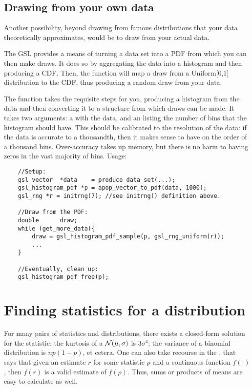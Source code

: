 \subsection{Drawing from your own data} 
Another possibility, beyond drawing from famous distributions that your
data theoretically approximates, would be to draw from your actual data.

The GSL provides a means of turning a data set into a PDF from which you
can then make draws.  It
does so by aggregating the data into a histogram and then producing a CDF.
Then, the  function will
map a draw from a Uniform[0,1] distribution to the CDF, thus producing a
random draw from your data.

The  function takes the requisite steps
for you, producing a histogram from the data and then converting it to
a  structure from which draws can be
made. It takes two arguments: a  with the data, and
an  listing the number of bins that the histogram should
have. This should be calibrated to the resolution of the data: if the
data is accurate to a thousandth, then it makes sense to have on the
order  of a thousand
bins. Over-accuracy takes up memory, but there is no harm to having
zeros in the vast majority of bins. Usage:
\begin{lstlisting}
    //Setup:
    gsl_vector  *data    = produce_data_set(...);
    gsl_histogram_pdf *p = apop_vector_to_pdf(data, 1000);
    gsl_rng *r = initrng(7); //see initrng() definition above.

    //Draw from the PDF:
    double      draw;
    while (get_more_data){
        draw = gsl_histogram_pdf_sample(p, gsl_rng_uniform(r));
        ...
    }

    //Eventually, clean up:
    gsl_histogram_pdf_free(p);
\end{lstlisting}


\section{Finding statistics for a distribution} \label{billiondraws}
For many pairs of statistics and distributions, there exists a closed-form
solution for the statistic: the kurtosis of a ${\cal N}(\mu,\sigma)$
is $3\sigma^4$; the variance of a binomial distribution is $np(1-p)$,
et cetera. One can also take recourse in the , that
says that given an estimate $r$ for some statistic $\rho$ and a continuous
function $f(\cdot)$, then $f(r)$ is a valid estimate of $f(\rho)$. Thus,
sums or products of means are easy to calculate as well.

